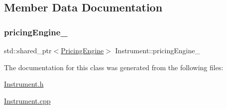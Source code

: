 \subsection{Member Data Documentation}
\hypertarget{class_instrument_a6fdd5548ccc944536ff73913d98bf598}{}\label{class_instrument_a6fdd5548ccc944536ff73913d98bf598} 
\subsubsection{\texorpdfstring{pricing\+Engine\+\_\+}{pricingEngine\_}}
{\footnotesize\ttfamily std\+::shared\+\_\+ptr$<$\hyperlink{class_pricing_engine}{Pricing\+Engine}$>$ Instrument\+::pricing\+Engine\+\_\+\hspace{0.3cm}{\ttfamily [protected]}}



The documentation for this class was generated from the following files\+:\begin{DoxyCompactItemize}
\item 
\hyperlink{_instrument_8h}{Instrument.\+h}\item 
\hyperlink{_instrument_8cpp}{Instrument.\+cpp}\end{DoxyCompactItemize}
